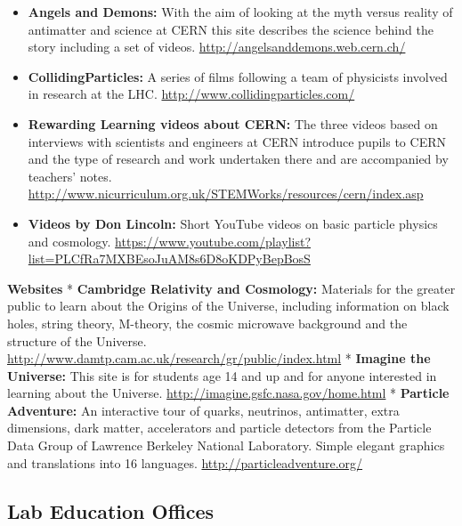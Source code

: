 \begin{itemize}
\tightlist
\item
  \textbf{Angels and Demons:} With the aim of looking at the myth versus
  reality of antimatter and science at CERN this site describes the
  science behind the story including a set of videos.
  \url{http://angelsanddemons.web.cern.ch/}
\item
  \textbf{CollidingParticles:} A series of films following a team of
  physicists involved in research at the LHC.
  \url{http://www.collidingparticles.com/}
\item
  \textbf{Rewarding Learning videos about CERN:} The three videos based
  on interviews with scientists and engineers at CERN introduce pupils
  to CERN and the type of research and work undertaken there and are
  accompanied by teachers' notes.
  \url{http://www.nicurriculum.org.uk/STEMWorks/resources/cern/index.asp}
\item
  \textbf{Videos by Don Lincoln:} Short YouTube videos on basic particle
  physics and cosmology.
  \url{https://www.youtube.com/playlist?list=PLCfRa7MXBEsoJuAM8s6D8oKDPyBepBosS}
\end{itemize}

\textbf{Websites} * \textbf{Cambridge Relativity and Cosmology:}
Materials for the greater public to learn about the Origins of the
Universe, including information on black holes, string theory, 
M-theory,
the cosmic microwave background and the structure of the Universe.
\url{http://www.damtp.cam.ac.uk/research/gr/public/index.html} *
\textbf{Imagine the Universe:} This site is for students age 14 and up
and for anyone interested in learning about the Universe.
\url{http://imagine.gsfc.nasa.gov/home.html} * \textbf{Particle
Adventure:} An interactive tour of quarks, neutrinos, antimatter, extra
dimensions, dark matter, accelerators and particle detectors from the
Particle Data Group of Lawrence Berkeley National Laboratory. Simple
elegant graphics and translations into 16 languages.
\url{http://particleadventure.org/}

\subsection{Lab Education Offices}\label{databases:subsec:labeducationoffices}

